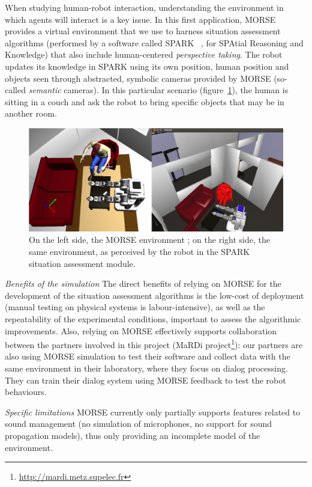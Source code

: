 \documentclass[letterpaper, 10pt, conference]{ieeeconf}
\begin{document}
When studying human-robot interaction, understanding the environment in which
agents will interact is a key issue. In this first application, MORSE provides a
virtual environment that we use to harness situation assessment algorithms
(performed by a software called SPARK ~\cite{Warnier2012a}, for SPAtial Reasoning and Knowledge) that
also include human-centered \emph{perspective taking}. The robot updates its
knowledge in SPARK using its own position, human position and objects seen
through abstracted, symbolic cameras provided by MORSE (so-called
\emph{semantic} cameras). In this particular scenario (figure~\ref{fig|spark}),
the human is sitting in a couch and ask the robot to bring specific objects that
may be in another room.

\begin{figure}[H]
      \centering
      \includegraphics[width=0.9\linewidth]{morsespark.png}
      \caption{On the left side, the MORSE environment ; on the right side, the same
      environment, as perceived by the robot in the SPARK situation assessment
      module.}
      \label{fig|spark}
\end{figure}

\emph{Benefits of the simulation} The direct benefits of relying on MORSE for
the development of the situation assessment algorithms is the low-cost of
deployment (manual testing on physical systems is labour-intensive), as well as
the repeatability of the experimental conditions, important to assess the
algorithmic improvements.  Also, relying on MORSE effectively supports
collaboration between the partners involved in this project (MaRDi
project\footnote{\url{http://mardi.metz.supelec.fr}}): our partners are also
using MORSE simulation to test their software and collect data with the same
environment in their laboratory, where they focus on dialog processing. They can
train their dialog system using MORSE feedback to test the robot behaviours.

\emph{Specific limitations} MORSE currently only partially supports features
related to sound management (no simulation of microphones, no support for sound
propagation models), thus only providing an incomplete model of the environment.
\end{document}
